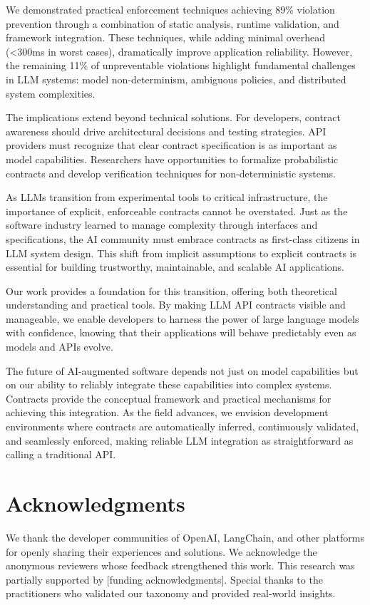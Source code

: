 \documentclass[11pt]{article}
\begin{document}
We demonstrated practical enforcement techniques achieving 89\% violation prevention through a combination of static analysis, runtime validation, and framework integration. These techniques, while adding minimal overhead (<300ms in worst cases), dramatically improve application reliability. However, the remaining 11\% of unpreventable violations highlight fundamental challenges in LLM systems: model non-determinism, ambiguous policies, and distributed system complexities.

The implications extend beyond technical solutions. For developers, contract awareness should drive architectural decisions and testing strategies. API providers must recognize that clear contract specification is as important as model capabilities. Researchers have opportunities to formalize probabilistic contracts and develop verification techniques for non-deterministic systems.

As LLMs transition from experimental tools to critical infrastructure, the importance of explicit, enforceable contracts cannot be overstated. Just as the software industry learned to manage complexity through interfaces and specifications, the AI community must embrace contracts as first-class citizens in LLM system design. This shift from implicit assumptions to explicit contracts is essential for building trustworthy, maintainable, and scalable AI applications.

Our work provides a foundation for this transition, offering both theoretical understanding and practical tools. By making LLM API contracts visible and manageable, we enable developers to harness the power of large language models with confidence, knowing that their applications will behave predictably even as models and APIs evolve.

The future of AI-augmented software depends not just on model capabilities but on our ability to reliably integrate these capabilities into complex systems. Contracts provide the conceptual framework and practical mechanisms for achieving this integration. As the field advances, we envision development environments where contracts are automatically inferred, continuously validated, and seamlessly enforced, making reliable LLM integration as straightforward as calling a traditional API.

\section*{Acknowledgments}

We thank the developer communities of OpenAI, LangChain, and other platforms for openly sharing their experiences and solutions. We acknowledge the anonymous reviewers whose feedback strengthened this work. This research was partially supported by [funding acknowledgments]. Special thanks to the practitioners who validated our taxonomy and provided real-world insights.
\end{document}
